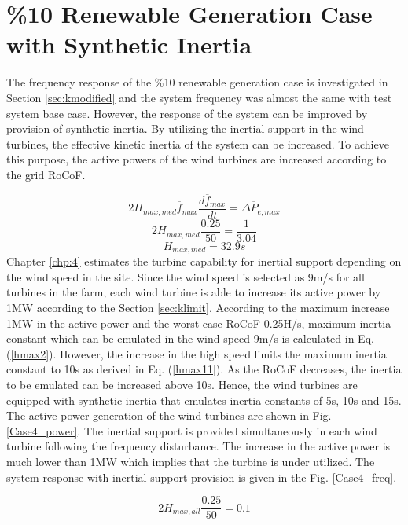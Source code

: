 \section{\%10 Renewable Generation Case with Synthetic Inertia}
The frequency response of the \%10 renewable generation case is investigated in Section \ref{sec:kmodified} and the system frequency was almost the same with test system base case. However, the response of the system can be improved by provision of synthetic inertia. By utilizing the inertial support in the wind turbines, the effective kinetic inertia of the system can be increased. To achieve this purpose, the active powers of the wind turbines are increased according to the grid RoCoF. \par
\begin{equation}
\label{hmax}
2H_{max,med}\overline{f}_{max}\frac{d\overline{f}_{max}}{dt}=\Delta\overline{P}_{e,max}
\end{equation}
\begin{equation}
\label{hmax1}
2H_{max,med}\frac{0.25}{50}=\frac{1}{3.04}
\end{equation}
\begin{equation}
\label{hmax2}
H_{max,med}=32.9s
\end{equation}
Chapter \ref{chp:4} estimates the turbine capability for inertial support depending on the wind speed in the site. Since the wind speed is selected as 9m/s for all turbines in the farm, each wind turbine is able to increase its active power by 1MW according to the Section \ref{sec:klimit}. According to the maximum increase 1MW in the active power and the worst case RoCoF 0.25H/s, maximum inertia constant which can be emulated in the wind speed 9m/s is calculated in Eq. (\ref{hmax2}). However, the increase in the high speed limits the maximum inertia constant to 10s as derived in Eq. (\ref{hmax11}). As the RoCoF decreases, the inertia to be emulated can be increased above 10s. Hence, the wind turbines are equipped with synthetic inertia that emulates inertia constants of 5s, 10s and 15s. The active power generation of the wind turbines are shown in Fig. \ref{Case4_power}. The inertial support is provided simultaneously in each wind turbine following the frequency disturbance. The increase in the active power is much lower than 1MW which implies that the turbine is under utilized. The system response with inertial support provision is given in the Fig. \ref{Case4_freq}.\par
\begin{equation}
\label{hmax11}
2H_{max,all}\frac{0.25}{50}=0.1
\end{equation}
